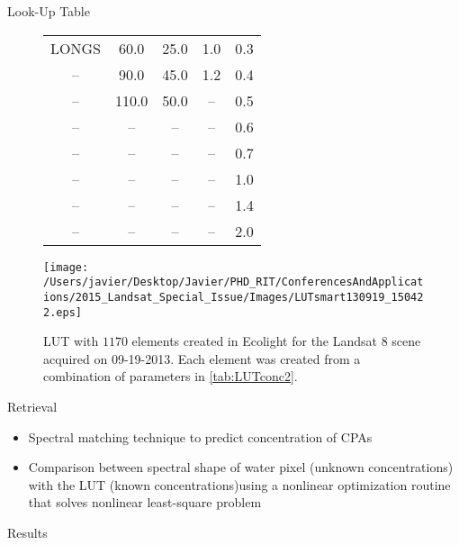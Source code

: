 \documentclass[mathserif]{beamer}
\begin{document}
\begin{frame}{}
\begin{columns}[t]
\begin{column}{.3\linewidth}
\begin{block}{Look-Up Table}
\begin{figure}[htb]
\begin{minipage}[c]{0.44\linewidth}
\begin{table}[htb]
\begin{tabular}{c|c|c|c|c}
LONGS   &  60.0   & 25.0    &  1.0    &  0.3  \\
--      &  90.0   & 45.0    &  1.2    &  0.4  \\
--      &  110.0  & 50.0    &  --     &  0.5  \\
--      &  --     & --      &  --     &  0.6  \\  
--      &  --     & --      &  --     &  0.7  \\  
--      &  --     & --      &  --     &  1.0  \\   
--      &  --     & --      &  --     &  1.4  \\  
--      &  --     & --      &  --     &  2.0  \\  \hline \hline
    \end{tabular}
  \end{table}
  \end{minipage}
  \hfill
  \begin{minipage}[d]{0.54\linewidth}  
    \centering
      \texttt{[image: /Users/javier/Desktop/Javier/PHD\_RIT/ConferencesAndApplications/2015\_Landsat\_Special\_Issue/Images/LUTsmart130919\_150422.eps]}
      \caption{LUT with $1170$ elements created in Ecolight for the Landsat 8 scene acquired on 09-19-2013. Each element was created from a combination of parameters in \autoref{tab:LUTconc2}.}
      \label{fig:LUT}
  \end{minipage}
\end{figure}


\end{block}
\begin{block}{Retrieval}
  \begin{itemize}
    \item Spectral matching technique to predict concentration of CPAs
    \vspace{0.5cm}
    \item Comparison between spectral shape of water pixel (unknown concentrations) with the LUT (known concentrations)using a nonlinear optimization routine that solves nonlinear least-square problem
  \end{itemize}
\end{block}

\begin{block}{Results}


\end{block}
\end{column}
\end{columns}
\end{frame}
\end{document}
